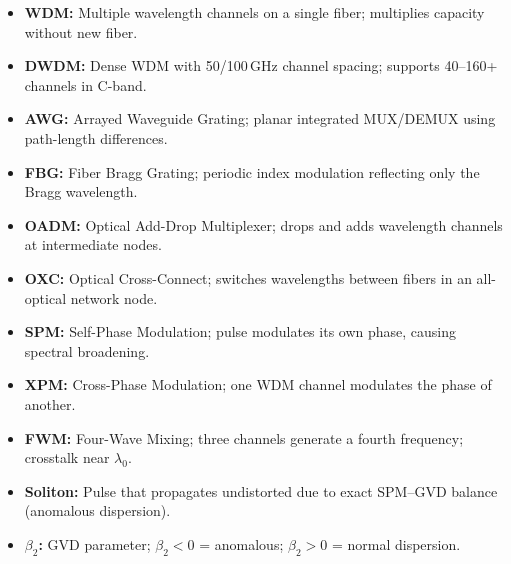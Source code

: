 \documentclass[12pt,a4paper]{article}
\begin{document}
\begin{tcolorbox}[defbox, title={\textbf{One-Line Definitions}}]
\begin{itemize}[leftmargin=*, itemsep=2pt, topsep=0pt]
  \item \textbf{WDM:} Multiple wavelength channels on a single fiber; multiplies capacity without new fiber.
  \item \textbf{DWDM:} Dense WDM with 50/100\,GHz channel spacing; supports 40--160+ channels in C-band.
  \item \textbf{AWG:} Arrayed Waveguide Grating; planar integrated MUX/DEMUX using path-length differences.
  \item \textbf{FBG:} Fiber Bragg Grating; periodic index modulation reflecting only the Bragg wavelength.
  \item \textbf{OADM:} Optical Add-Drop Multiplexer; drops and adds wavelength channels at intermediate nodes.
  \item \textbf{OXC:} Optical Cross-Connect; switches wavelengths between fibers in an all-optical network node.
  \item \textbf{SPM:} Self-Phase Modulation; pulse modulates its own phase, causing spectral broadening.
  \item \textbf{XPM:} Cross-Phase Modulation; one WDM channel modulates the phase of another.
  \item \textbf{FWM:} Four-Wave Mixing; three channels generate a fourth frequency; crosstalk near $\lambda_0$.
  \item \textbf{Soliton:} Pulse that propagates undistorted due to exact SPM--GVD balance (anomalous dispersion).
  \item \textbf{$\beta_2$:} GVD parameter; $\beta_2 < 0$ = anomalous; $\beta_2 > 0$ = normal dispersion.
\end{itemize}
\end{tcolorbox}
\end{document}
